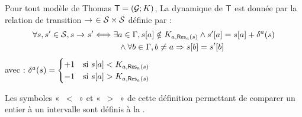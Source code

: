 \begin{definition}
  Pour tout modèle de Thomas $\mathsf{T} = (\mathcal{G}; K)$,
  La dynamique de $\mathsf{T}$ est donnée par la relation de transition
  $\rightarrow_{}\ \in \mathcal{S} \times \mathcal{S}$ définie par :
  \begin{align*}
    \forall s, s' \in \mathcal{S}, s \rightarrow_{} s'
      &\Longleftrightarrow \exists a \in \mathrm{\Gamma},
    {s[a]} \notin K_{a, \mathsf{Res}_{a}(s)} \wedge
      {s'[a]} = {s[a]} + \delta^a(s) \\
      &\qquad\quad \wedge \forall b \in \mathrm{\Gamma}, b \neq a \Rightarrow {s[b]} = {s'[b]}
  \end{align*}
  avec : $\delta^a(s) = 
    \begin{cases}
      +1 & \text{si } {s[a]} < K_{a, \mathsf{Res}_{a}(s)} \\
      -1 & \text{si } {s[a]} > K_{a, \mathsf{Res}_{a}(s)} \\
    \end{cases}$
\end{definition}
Les symboles «~$<$~» et «~$>$~» de cette définition permettant de comparer un entier à
un intervalle sont définis à la .



